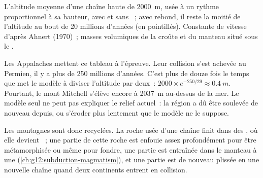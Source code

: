 \begin{omfigure}

{\small L'altitude moyenne d'une chaîne haute de \qty{2000}{m}, usée à un
rythme proportionnel à sa hauteur, avec et sans ~; avec
rebond, il reste la moitié de l'altitude au bout de 20 millions d'années
(en pointillés). Constante de vitesse d'après Ahnert (1970)~; masses
volumiques de la croûte et du manteau situé sous le .}
\end{omfigure}

Les Appalaches mettent ce tableau à l'épreuve. Leur collision s'est achevée
au Permien, il y a plus de 250 millions d'années. C'est plus de douze fois
le temps que met le modèle à diviser l'altitude par deux~: $2000 \times e^{-250/29} \approx
\qty{0.4}{m}$. Pourtant, le mont Mitchell s'élève encore à \qty{2037}{m}
au-dessus de la mer. Le modèle seul ne peut pas expliquer le relief
actuel~: la région a dû être soulevée de nouveau depuis, ou s'éroder plus
lentement que le modèle ne le suppose.

Les montagnes sont donc recyclées. La roche usée d'une chaîne finit dans
des , où elle devient ~; une partie
de cette roche est enfouie assez profondément pour être métamorphisée ou
même pour fondre, une partie est entraînée dans le manteau à une  (\cref{ch:g12:subduction-magmatism}), et une partie est de
nouveau plissée en une nouvelle chaîne quand deux continents entrent en
collision.

